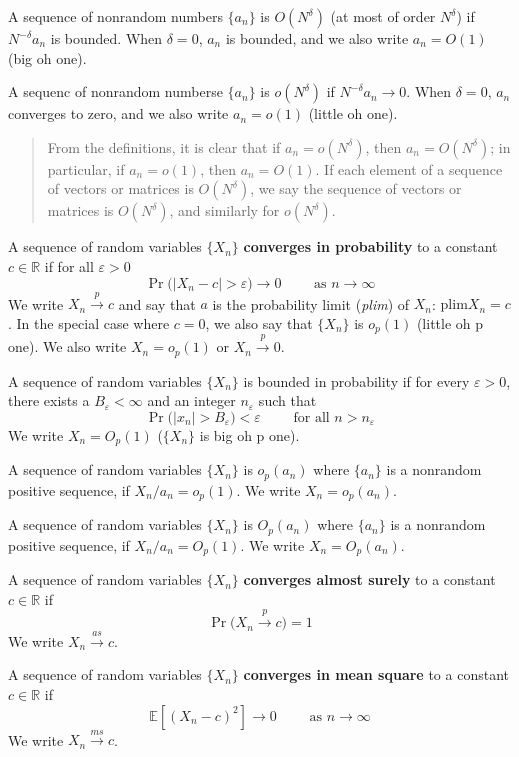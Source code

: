 \documentclass[12pt,]{book}
\begin{document}
A sequence of nonrandom numbers \(\{ a_n \}\) is \(O(N^\delta)\) (at most of order \(N^\delta\)) if \(N^{-\delta} a_n\) is bounded. When \(\delta=0\), \(a_n\) is bounded, and we also write \(a_n = O(1)\) (big oh one).

A sequenc of nonrandom numberse \(\{ a_n \}\) is \(o(N^\delta)\) if \(N^{-\delta} a_n \to 0\). When \(\delta=0\), \(a_n\) converges to zero, and we also write \(a_n = o(1)\) (little oh one).

\begin{quote}
From the definitions, it is clear that if \(a_n = o(N^{\delta})\), then \(a_n = O(N^\delta)\); in particular, if \(a_n = o(1)\), then \(a_n = O(1)\). If each element of a sequence of vectors or matrices is \(O(N^\delta)\), we say the sequence of vectors or matrices is \(O(N^\delta)\), and similarly for \(o(N^\delta)\).
\end{quote}

A sequence of random variables \(\{ X_n \}\) \textbf{converges in probability} to a constant \(c \in \mathbb R\) if for all \(\varepsilon>0\)
\[
    \Pr \big( |X_n - c| > \varepsilon \big) \to 0 \qquad \text{ as } n \to \infty
\]
We write \(X_n \overset{p}{\to} c\) and say that \(a\) is the probability limit (\emph{plim}) of \(X_n\): \(\mathrm{plim} X_n = c\). In the special case where \(c=0\), we also say that \(\{ X_n \}\) is \(o_p(1)\) (little oh p one). We also write \(X_n = o_p(1)\) or \(X_n \overset{p}{\to} 0\).

A sequence of random variables \(\{ X_n \}\) is bounded in probability if for every \(\varepsilon>0\), there exists a \(B _ \varepsilon < \infty\) and an integer \(n_ \varepsilon\) such that
\[
    \Pr \big( |x_ n| > B_ \varepsilon \big) < \varepsilon \qquad \text{ for all } n > n_ \varepsilon
\]
We write \(X_n = O_p(1)\) (\(\{ X_n \}\) is big oh p one).

A sequence of random variables \(\{ X_n \}\) is \(o_p(a_n)\) where \(\{ a_n \}\) is a nonrandom positive sequence, if \(X_n/a_n = o_p(1)\). We write \(X_n = o_p(a_n)\).

A sequence of random variables \(\{ X_n \}\) is \(O_p(a_n)\) where \(\{ a_n \}\) is a nonrandom positive sequence, if \(X_n/a_n = O_p(1)\). We write \(X_n = O_p(a_n)\).

A sequence of random variables \(\{ X_n \}\) \textbf{converges almost surely} to a constant \(c \in \mathbb R\) if
\[
    \Pr \big( X_n \overset{p}{\to} c \big) = 1
\]
We write \(X_n \overset{as}{\to} c\).

A sequence of random variables \(\{ X_n \}\) \textbf{converges in mean square} to a constant \(c \in \mathbb R\) if
\[
  \mathbb E [(X_n - c)^2] \to 0  \qquad \text{ as } n \to \infty
\]
We write \(X_n \overset{ms}{\to} c\).
\end{document}
